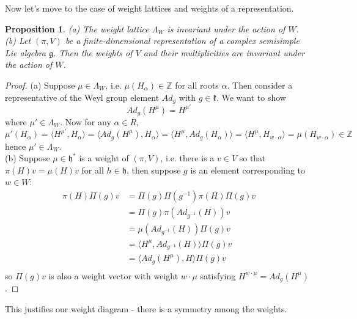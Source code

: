 \documentclass[11pt]{book}
\newtheorem{proposition}[theorem]{Proposition}
\newcommand{\bb}[1]{\mathbb{#1}}
\newcommand{\mf}[1]{\mathfrak{#1}}
\begin{document}
Now let's move to the case of weight lattices and weights of a representation.
\begin{proposition} \label{wtweyl}
(a) The weight lattice $\Lambda_W$ is invariant under the action of $W$.\\
(b) Let $(\pi,V)$ be a finite-dimensional representation of a complex semisimple Lie algebra $\mf{g}$. Then the weights of $V$ and their multiplicities are invariant under the action of $W$.\\
\end{proposition}
\begin{proof}
(a) Suppose $\mu \in \Lambda_W$, i.e. $\mu(H_{\alpha}) \in \bb{Z}$ for all roots $\alpha$. Then consider a representative of the Weyl group element $Ad_g$ with $g \in \mf{k}$. We want to show
$$Ad_g (H^{\mu}) = H^{\mu'}$$
where $\mu' \in \Lambda_W$. Now for any $\alpha \in R$,
$$\mu'(H_{\alpha}) = \langle H^{\mu'}, H_{\alpha} \rangle = \langle Ad_g (H^{\mu}), H_{\alpha} \rangle = \langle H^{\mu},  Ad_g(H_{\alpha}) \rangle = \langle H^{\mu}, H_{w\cdot \alpha} \rangle = \mu(H_{w \cdot \alpha}) \in \bb{Z}$$
hence $\mu' \in \Lambda_W$.\\
(b) Suppose $\mu \in \mf{h}^*$ is a weight of $(\pi,V)$, i.e. there is a $v \in V$ so that $\pi(H)v = \mu(H)v$ for all $h \in \mf{h}$, then suppose $g$ is an element corresponding to $w \in W$:
\begin{align*}
\pi(H) \Pi(g)v &= \Pi(g) \Pi(g^{-1})\pi(H)\Pi(g)v\\
&= \Pi(g) \pi(Ad_{g^{-1}}(H))v\\
&= \mu(Ad_{g^{-1}}(H)) \Pi(g)v\\
&= \langle H^{\mu}, Ad_{g^{-1}}(H) \rangle \Pi(g)v\\
&= \langle Ad_{g}(H^{\mu}), H \rangle \Pi(g)v\\
\end{align*}
so $\Pi(g)v$ is also a weight vector with weight $w\cdot \mu$ satisfying $H^{w \cdot \mu} = Ad_g(H^{\mu})$.
\end{proof}
This justifies our weight diagram - there is a symmetry among the weights.\\
\end{document}
